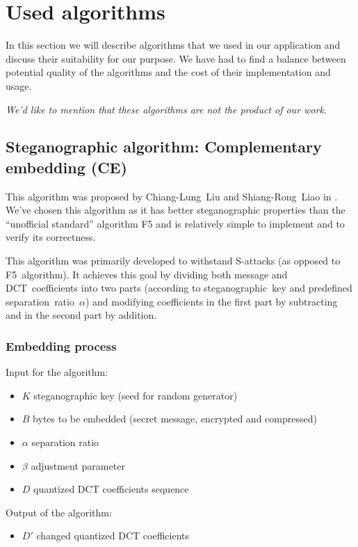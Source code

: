 \section{Used algorithms}
In this section we will describe algorithms that we used in our application
and discuss their suitability for our purpose. 
We have had to find a balance between potential quality of the algorithms 
and the cost of their implementation and usage.

\textit{We'd like to mention that these algorithms are not the product of our work.}

\subsection{Steganographic algorithm: Complementary embedding (CE)}
\label{ssec:ce}

This algorithm was proposed by Chiang-Lung~Liu and Shiang-Rong~Liao in \cite{liu2008high}.
We've chosen this algorithm as it has better steganographic properties than the ``unofficial
standard'' algorithm F5 and is relatively simple to implement and to verify its correctness.

This algorithm was primarily developed to withstand S-attacks (as opposed to F5~algorithm).
It achieves this goal by dividing both message and DCT~coefficients into two parts
(according to steganographic~key and predefined separation~ratio~$\alpha$) and
modifying coefficients in the first part by subtracting and in the second part by addition.

\subsubsection{Embedding process}
\label{sssec:therory-embedding}
Input for the algorithm:

\begin{itemize}
    \item $K$ steganographic key (seed for random generator)
    \item $B$ bytes to be embedded (secret message, encrypted and compressed)
    \item $\alpha$ separation ratio
    \item $\beta$ adjustment parameter
    \item $D$ quantized DCT coefficients sequence
\end{itemize}

Output of the algorithm:

\begin{itemize}
    \item $D'$ changed quantized DCT coefficients
\end{itemize}

